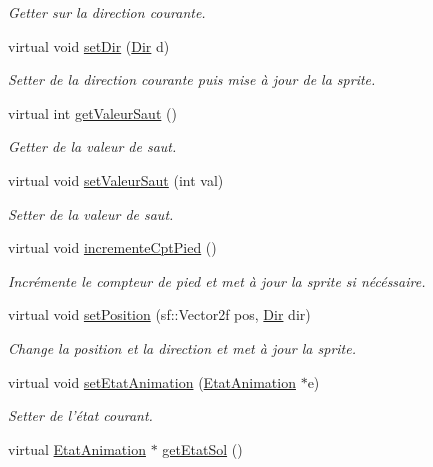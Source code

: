 \begin{DoxyCompactItemize}
\begin{DoxyCompactList}\small\item\em Getter sur la direction courante. \end{DoxyCompactList}\item 
virtual void \hyperlink{classPersonnage_a74949b5474c36ebd0076981d158935fc}{set\-Dir} (\hyperlink{Espace_8h_a7cf6e8c5a5bc5e7b2afef3647870b1c4}{Dir} d)
\begin{DoxyCompactList}\small\item\em Setter de la direction courante puis mise à jour de la sprite. \end{DoxyCompactList}\item 
\hypertarget{classPersonnage_a07fb79f56c22d886a12441d2877033e9}{virtual int \hyperlink{classPersonnage_a07fb79f56c22d886a12441d2877033e9}{get\-Valeur\-Saut} ()}\label{classPersonnage_a07fb79f56c22d886a12441d2877033e9}

\begin{DoxyCompactList}\small\item\em Getter de la valeur de saut. \end{DoxyCompactList}\item 
virtual void \hyperlink{classPersonnage_a8b340c7bb2fbe7bc89d5935ab1605cf6}{set\-Valeur\-Saut} (int val)
\begin{DoxyCompactList}\small\item\em Setter de la valeur de saut. \end{DoxyCompactList}\item 
\hypertarget{classPersonnage_ac71ef3ce2ce04f62edbf92dc66864a3e}{virtual void \hyperlink{classPersonnage_ac71ef3ce2ce04f62edbf92dc66864a3e}{incremente\-Cpt\-Pied} ()}\label{classPersonnage_ac71ef3ce2ce04f62edbf92dc66864a3e}

\begin{DoxyCompactList}\small\item\em Incrémente le compteur de pied et met à jour la sprite si nécéssaire. \end{DoxyCompactList}\item 
virtual void \hyperlink{classPersonnage_a08cefca948cf0bc524af95d5657fa124}{set\-Position} (sf\-::\-Vector2f pos, \hyperlink{Espace_8h_a7cf6e8c5a5bc5e7b2afef3647870b1c4}{Dir} dir)
\begin{DoxyCompactList}\small\item\em Change la position et la direction et met à jour la sprite. \end{DoxyCompactList}\item 
virtual void \hyperlink{classPersonnage_a0d32fe5b545abf8617dbe0448bf9505a}{set\-Etat\-Animation} (\hyperlink{classEtatAnimation}{Etat\-Animation} $\ast$e)
\begin{DoxyCompactList}\small\item\em Setter de l'état courant. \end{DoxyCompactList}\item 
\hypertarget{classPersonnage_ab1d6128e535e6baed287f4b9f566d64d}{virtual \hyperlink{classEtatAnimation}{Etat\-Animation} $\ast$ \hyperlink{classPersonnage_ab1d6128e535e6baed287f4b9f566d64d}{get\-Etat\-Sol} ()}\label{classPersonnage_ab1d6128e535e6baed287f4b9f566d64d}


\end{DoxyCompactItemize}
